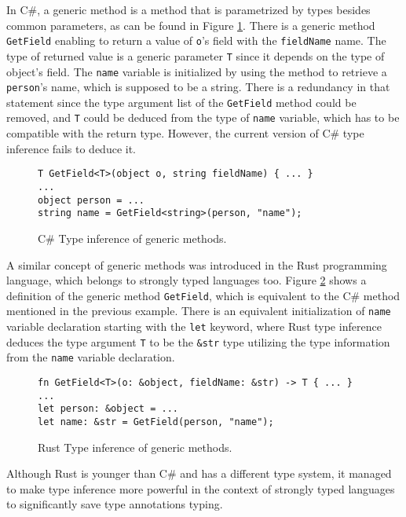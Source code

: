 In C\#, a generic method is a method that is parametrized by types besides common parameters, as can be found in Figure \ref{img03:csharp_gen_meth}.
There is a generic method \texttt{GetField} enabling to return a value of \texttt{o}'s field with the \texttt{fieldName} name.
The type of returned value is a generic parameter \texttt{T} since it depends on the type of object's field.
The \texttt{name} variable is initialized by using the method to retrieve a \texttt{person}'s name, which is supposed to be a string.
There is a redundancy in that statement since the type argument list of the \texttt{GetField} method could be removed, and \texttt{T} could be deduced from the type of \texttt{name} variable, which has to be compatible with the return type.
However, the current version of C\# type inference fails to deduce it.
\begin{figure}
\begin{lstlisting}[style=csharp]
T GetField<T>(object o, string fieldName) { ... }
...
object person = ...
string name = GetField<string>(person, "name");
\end{lstlisting}
\caption{C\# Type inference of generic methods.}
\label{img03:csharp_gen_meth}
\end{figure}
\par
A similar concept of generic methods was introduced in the Rust \cite{online:rust} programming language, which belongs to strongly typed languages too.
Figure \ref{img04:rust_gen_meth} shows a definition of the generic method \texttt{GetField}, which is equivalent to the C\# method mentioned in the previous example.
There is an equivalent initialization of \texttt{name} variable declaration starting with the \texttt{let} keyword, where Rust type inference deduces the type argument \texttt{T} to be the \texttt{\&str} type utilizing the type information from the \texttt{name} variable declaration.
\begin{figure}[h]
\begin{lstlisting}[style=csharp]
fn GetField<T>(o: &object, fieldName: &str) -> T { ... }
...
let person: &object = ...
let name: &str = GetField(person, "name");
\end{lstlisting}
\caption{Rust Type inference of generic methods.}
\label{img04:rust_gen_meth}
\end{figure}
\par
Although Rust is younger than C\# and has a different type system, it managed to make type inference more powerful in the context of strongly typed languages to significantly save type annotations typing.
